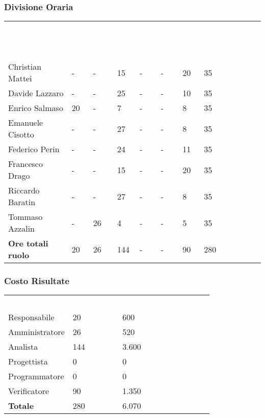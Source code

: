 \subsubsection{Divisione Oraria}
{
	\renewcommand{\arraystretch}{2}
	\centering
	\begin{longtable}{ C{5cm} C{1cm} C{1cm} C{1cm} C{1cm} C{1cm} C{1cm} C{3cm}}
		\textcolor{white}{\textbf{Nome membro del gruppo}} & \textcolor{white}{\textbf{RE}} & \textcolor{white}{\textbf{AM}} & \textcolor{white}{\textbf{AN}} & \textcolor{white}{\textbf{PT}} & \textcolor{white}{\textbf{PR}} & \textcolor{white}{\textbf{VE}} & \textcolor{white}{\textbf{Ore complessive}}\\	
        
        
        Christian Mattei & - & - & 15 & - & - & 20 & 35  \\
        Davide Lazzaro & - & - & 25 & - & - & 10 & 35 \\
        Enrico Salmaso & 20 & - & 7 & - & - & 8 & 35 \\
        Emanuele Cisotto & - & - & 27 & - & - & 8 & 35 \\
        Federico Perin & - & - & 24 & - & - & 11 & 35 \\
        Francesco Drago & - & - & 15 & - & - & 20 & 35  \\
        Riccardo Baratin & - & - & 27 & - & - & 8 & 35 \\
        Tommaso Azzalin & - & 26 & 4 & - & - & 5 & 35 \\
        \textbf{Ore totali ruolo} & 20 & 26 & 144 & - & - & 90 & 280 \\
		
	\end{longtable}
}

\subsubsection{Costo Risultate}
{
	\renewcommand{\arraystretch}{2}
	\centering
	\begin{longtable}{ C{3cm} C{2cm} C{4cm}}
		\textcolor{white}{\textbf{Ruolo}} & \textcolor{white}{\textbf{Totale ore}} & \textcolor{white}{\textbf{Costo Ruolo in euro}}\\	
        
        Responsabile & 20 & 600\\
        Amministratore & 26 & 520\\
        Analista & 144 & 3.600 \\
        Progettista & 0 & 0 \\
        Programmatore & 0 & 0 \\
        Verificatore & 90 & 1.350 \\
        \textbf{Totale} & 280 & 6.070 \\
		
	\end{longtable}
}

